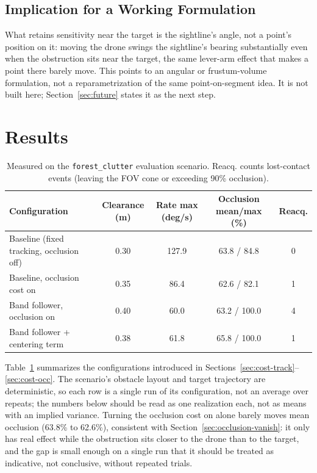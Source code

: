 \documentclass[conference]{IEEEtran}
\begin{document}
\subsection{Implication for a Working Formulation}
\label{sec:occlusion-implication}

What retains sensitivity near the target is the sightline's angle, not a point's position on it: moving the drone swings the sightline's bearing substantially even when the obstruction sits near the target, the same lever-arm effect that makes a point there barely move. This points to an angular or frustum-volume formulation, not a reparametrization of the same point-on-segment idea. It is not built here; Section~\ref{sec:future} states it as the next step.

\section{Results}
\label{sec:results}

\begin{table}[t]
\centering
\caption{Measured on the \texttt{forest\_clutter} evaluation scenario. Reacq. counts lost-contact events (leaving the FOV cone or exceeding 90\% occlusion).}
\label{tab:results}
\begin{tabular}{lcccc}
\hline
Configuration & Clearance (m) & Rate max (deg/s) & Occlusion mean/max (\%) & Reacq. \\
\hline
Baseline (fixed tracking, occlusion off) & 0.30 & 127.9 & 63.8 / 84.8 & 0 \\
Baseline, occlusion cost on & 0.35 & 86.4 & 62.6 / 82.1 & 1 \\
Band follower, occlusion on & 0.40 & 60.0 & 63.2 / 100.0 & 4 \\
Band follower + centering term & 0.38 & 61.8 & 65.8 / 100.0 & 1 \\
\hline
\end{tabular}
\end{table}

Table~\ref{tab:results} summarizes the configurations introduced in Sections~\ref{sec:cost-track}--\ref{sec:cost-occ}. The scenario's obstacle layout and target trajectory are deterministic, so each row is a single run of its configuration, not an average over repeats; the numbers below should be read as one realization each, not as means with an implied variance. Turning the occlusion cost on alone barely moves mean occlusion (63.8\% to 62.6\%), consistent with Section~\ref{sec:occlusion-vanish}: it only has real effect while the obstruction sits closer to the drone than to the target, and the gap is small enough on a single run that it should be treated as indicative, not conclusive, without repeated trials.
\end{document}
